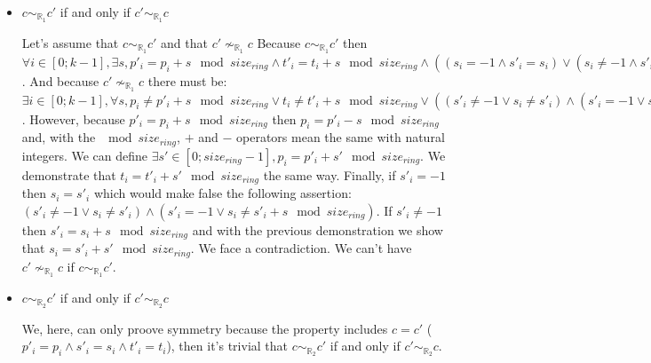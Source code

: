 \documentclass{article}
\begin{document}
\begin{itemize}
\begin{itemize}
        \item \begin{center} $c\sim_{\mathbb{R}_{1}}c'$ if and only if $c'\sim_{\mathbb{R}_{1}}c$\end{center}
        Let's assume that $c\sim_{\mathbb{R}_{1}}c'$ and that $c'\nsim_{\mathbb{R}_{1}}c$\newline
        Because $c\sim_{\mathbb{R}_{1}}c'$ then $\forall i \in [0;k-1], \exists s , p'_{i} = p_{i} + s \mod{size_{ring}} \land t'_{i} = t_{i} + s \mod{size_{ring}} \land  ( (s_{i} = -1 \land s'_{i} = s_{i}) \lor  (s_{i} \not= -1 \land s'_{i} = s_{i} + s \mod{size_{ring}}))$.\newline
        And because $c'\nsim_{\mathbb{R}_{1}}c$ there must be: $\exists i \in [0; k-1], \forall s , p_{i} \not= p'_{i} + s \mod{size_{ring}} \lor t_{i} \not= t'_{i} + s \mod{size_{ring}} \lor  ( (s'_{i}\not= -1 \lor s_{i}\not= s'_{i}) \land  (s'_{i} = -1 \lor s_{i} \not= s'_{i} + s \mod{size_{ring}}))$.\newline
        However, because $p'_{i} = p_{i} + s \mod{size_{ring}}$ then $p_{i} = p'_{i} - s \mod{size_{ring}}$ and, with the $\mod{size_{ring}}$, $+$ and $-$ operators mean the same with natural integers. We can define $\exists s' \in [0; size_{ring}-1], p_{i} = p'_{i} + s'\mod{size_{ring}}$.\newline
        We demonstrate that $t_{i} = t'_{i} + s'\mod{size_{ring}}$ the same way.\newline
        Finally, if $s'_{i} = -1$ then $s_{i} = s'_{i}$ which would make false the following assertion: $ (s'_{i}\not= -1 \lor s_{i}\not= s'_{i}) \land  (s'_{i} = -1 \lor s_{i} \not= s'_{i} + s \mod{size_{ring}})$. If $s'_{i} \not= -1$ then $s'_{i} = s_{i} + s \mod{size_{ring}}$ and with the previous demonstration we show that $s_{i} = s'_{i} + s'\mod{size_{ring}}$.\newline
        We face a contradiction. We can't have $c'\nsim_{\mathbb{R}_{1}}c$ if $c\sim_{\mathbb{R}_{1}}c'$.

        \item \begin{center} $c\sim_{\mathbb{R}_{2}}c'$ if and only if $c'\sim_{\mathbb{R}_{2}}c$\end{center}
        We, here, can only proove symmetry because the property includes $c = c'$  ($p'_{i} = p_{i} \land s'_{i} = s_{i} \land t'_{i} = t_{i}$), then it's trivial that $c\sim_{\mathbb{R}_{2}}c'$ if and only if $c'\sim_{\mathbb{R}_{2}}c$.
        

\end{itemize}
\end{itemize}
\end{document}
